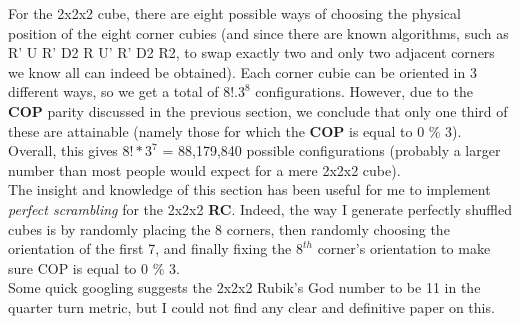\label{Theory:222RCSSS}

For the 2x2x2 cube, there are eight possible ways of choosing the physical position of the eight corner cubies (and since there are known algorithms, such as R’ U R’ D2 R U’ R’ D2 R2, to swap exactly two and only two adjacent corners we know all can indeed be obtained). Each corner cubie can be oriented in 3 different ways, so we get a total of $8! . 3^{8}$ configurations. However, due to the \textbf{COP} parity discussed in the previous section, we conclude that only one third of these are attainable (namely those for which the \textbf{COP} is equal to 0 \% 3). Overall, this gives $8! * 3^{7}$ = 88,179,840 possible configurations (probably a larger number than most people would expect for a mere 2x2x2 cube).
\\
The insight and knowledge of this section has been useful for me to implement \textit{perfect scrambling} for the 2x2x2 \textbf{RC}. Indeed, the way I generate perfectly shuffled cubes is by randomly placing the 8 corners, then randomly choosing the orientation of the first 7, and finally fixing the $8^{th}$ corner's orientation to make sure COP is equal to 0 \% 3.
\\
Some quick googling suggests the 2x2x2 Rubik's God number to be 11 in the quarter turn metric, but I could not find any clear and definitive paper on this.


